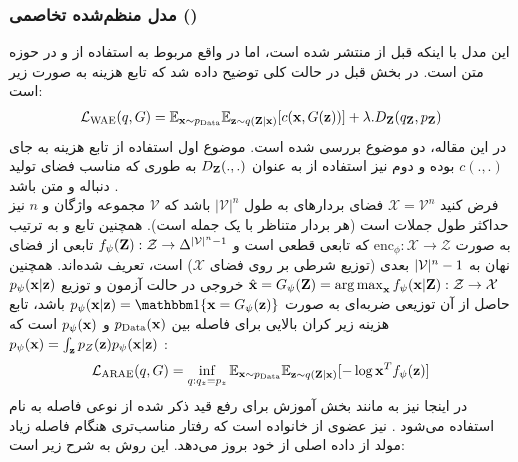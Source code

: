 \subsubsection{
    مدل \autoencoder{} منظم‌شده تخاصمی ()
\protect{}
} \label{chap2:arae}
این مدل با اینکه قبل از \wae{} منتشر شده است، اما در واقع مربوط به استفاده از \wgan{} و \wae{} در حوزه متن است. در بخش قبل در حالت کلی توضیح داده شد که تابع هزینه \wae{} به صورت زیر است:
\begin{align}
	\mathcal{L}_{\text{WAE}}(q, G) = \mathbb E_{{\bf x} \sim p_{\text{Data}}}\mathbb E_{{\bf z} \sim q({\bf Z}|{\bf x})} [c({\bf x}, G({\bf z}))] + \lambda . D_ {\bf Z}(q_{\bf Z}, p_{\bf Z})
\end{align}
در این مقاله، دو موضوع بررسی شده است. موضوع اول استفاده از تابع هزینه \crossentropy{} به جای $c(.,.)$ بوده و دوم نیز استفاده از \wgan{} به عنوان $D_{\bf Z}(.,.)$ به طوری که مناسب فضای تولید دنباله و متن باشد \cite{wae_text_reg}.
\\
فرض کنید $\mathcal{X} = \mathcal{V}^n$ فضای بردارهای
به طول $|\mathcal{V}|^n$ باشد که $\mathcal{V}$ مجموعه واژگان و $n$ نیز حداکثر طول جملات است (هر بردار متناظر با یک جمله است). همچنین تابع \encoder{} و \decoder{} به ترتیب به صورت
$\text{enc}_\phi: \mathcal{X} \rightarrow \mathcal{Z}$
که تابعی قطعی است و $f_\psi({\bf Z}) : {\mathcal{Z}} \rightarrow \Delta^{|{\mathcal{V}}|^n - 1}$ تابعی از فضای نهان به
 $|{\mathcal{V}}|^n - 1$
بعدی (توزیع شرطی بر روی فضای $\mathcal{X}$) است، تعریف شده‌اند. همچنین
\linebreak
$\hat{{\bf x}} = G_\psi({\bf Z})  = \operatorname*{arg\,max}_{
		{\bf x}} f_\psi({\bf x}|{\bf Z}) : {\mathcal{Z}} \rightarrow {\mathcal{X}}$
خروجی \decoder{} در حالت آزمون و توزیع $p_\psi({\bf x}|{\bf z})$ حاصل از آن توزیعی ضربه‌ای به صورت
$p_\psi(\bff{x}|\bff{z}) = \bbm{1}\{\bff{x} = G_\psi(\bff{z})\}$
باشد، تابع هزینه زیر کران بالایی برای فاصله \wasser{} بین $p_\text{Data}({\bf x})$ و $p_\psi({\bf x})$ است که
$p_\psi({\bf x}) = \int_{\bf z} p_Z({\bf z})p_\psi({\bf x}|{\bf z})$
:
\begin{align}
	\mathcal{L}_{\text{ARAE}}(q, G) = \inf_{q: q_z = p_z} \mathbb E_{{\bf x} \sim p_{\text{Data}}}\mathbb E_{{\bf z} \sim q({\bf Z}|{\bf x})} [-\log {\bf x}^T f_\psi({\bf z})]
\end{align}
در اینجا نیز به مانند بخش آموزش  \wae{} برای رفع قید ذکر شده از نوعی فاصله به نام \wgan{} استفاده می‌شود \cite{wae_text_reg}.
 \wgan{} نیز عضوی از خانواده \gan{} است که رفتار مناسب‌تری هنگام فاصله زیاد مولد از داده اصلی از خود بروز می‌دهد. این روش به شرح زیر است:
